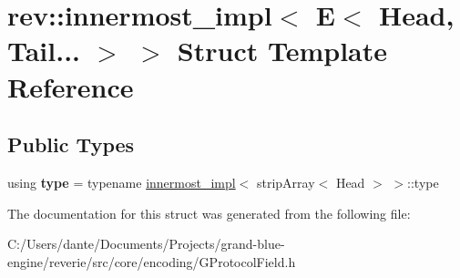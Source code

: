 \hypertarget{structrev_1_1innermost__impl_3_01_e_3_01_head_00_01_tail_8_8_8_01_4_01_4}{}\section{rev\+::innermost\+\_\+impl$<$ E$<$ Head, Tail... $>$ $>$ Struct Template Reference}
\label{structrev_1_1innermost__impl_3_01_e_3_01_head_00_01_tail_8_8_8_01_4_01_4}
\subsection*{Public Types}
\begin{DoxyCompactItemize}
\item 
\mbox{\label{structrev_1_1innermost__impl_3_01_e_3_01_head_00_01_tail_8_8_8_01_4_01_4_a44b10d4a025c07e2ec7bca0077a253dc}} 
using {\bfseries type} = typename \mbox{\hyperlink{structrev_1_1innermost__impl}{innermost\+\_\+impl}}$<$ strip\+Array$<$ Head $>$ $>$\+::type
\end{DoxyCompactItemize}


The documentation for this struct was generated from the following file\+:\begin{DoxyCompactItemize}
\item 
C\+:/\+Users/dante/\+Documents/\+Projects/grand-\/blue-\/engine/reverie/src/core/encoding/G\+Protocol\+Field.\+h\end{DoxyCompactItemize}
